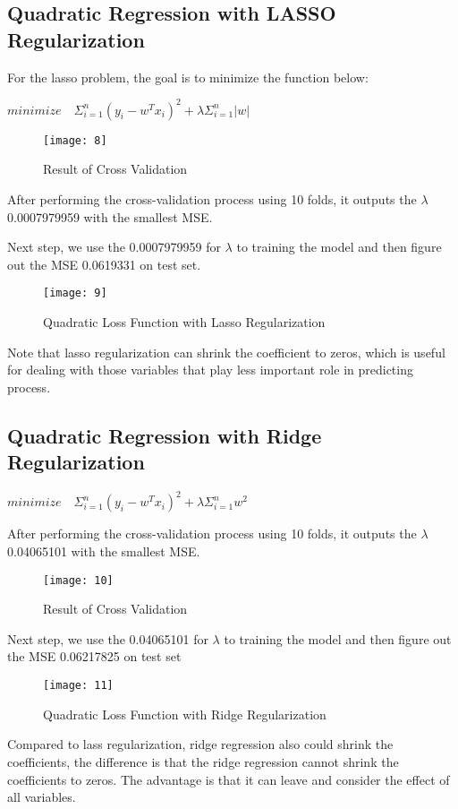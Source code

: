 \documentclass[12pt,twocolumn,twoside]{article}
\begin{document}
\subsection{Quadratic Regression with LASSO Regularization}
For the lasso problem, the goal is to minimize the function below:
\begin{center}
$minimize \quad \Sigma_{i=1}^n (y_i -w^T x_i)^2+\lambda \Sigma_{i=1}^n \vert w \vert$
\end{center}
\begin{figure}[h]
\texttt{[image: 8]}
\caption{Result of Cross Validation}
\end{figure}
After performing the cross-validation process using 10 folds, it outputs the $\lambda$ 0.0007979959 with the smallest MSE.


Next step, we use the 0.0007979959 for $\lambda$ to training the model and then figure out the MSE 0.0619331 on test set. 
\begin{figure}[h]
\texttt{[image: 9]}
\caption{Quadratic Loss Function with Lasso Regularization}
\end{figure}
Note that lasso regularization can shrink the coefficient to zeros, which is useful for dealing with those variables that play less important role in predicting process. 
\subsection{Quadratic Regression with Ridge Regularization}
\begin{center}
$minimize \quad \Sigma_{i=1}^n (y_i -w^T x_i)^2+\lambda \Sigma_{i=1}^n w^2$
\end{center}
After performing the cross-validation process using 10 folds, it outputs the $\lambda$ 0.04065101 with the smallest MSE.
\begin{figure}[h]
\texttt{[image: 10]}
\caption{Result of Cross Validation}
\end{figure}
Next step, we use the 0.04065101 for $\lambda$ to training the model and then figure out the MSE 0.06217825 on test set
\begin{figure}[h]
\texttt{[image: 11]}
\caption{Quadratic Loss Function with Ridge Regularization}
\end{figure}
Compared to lass regularization, ridge regression also could shrink the coefficients, the difference is that the ridge regression cannot shrink the coefficients to zeros. The advantage is that it can leave and consider the effect of all variables.
\end{document}
